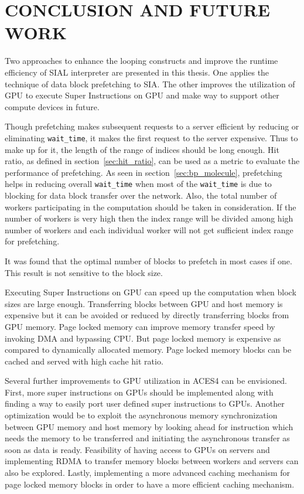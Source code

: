 \chapter{CONCLUSION AND FUTURE WORK}\label{conclusion}
Two approaches to enhance the looping constructs and improve the runtime efficiency
of SIAL interpreter are presented in this thesis. One applies the technique of
data block prefetching to SIA. The other improves
the utilization of GPU to execute Super Instructions on GPU and make way to support
other compute devices in future.

Though prefetching makes subsequent requests to a server efficient by reducing or
eliminating \texttt{wait\_time}, it makes the first request to the server expensive.
Thus to make up for it, the length of the range of indices should be long enough. Hit
ratio, as defined in section~\ref{sec:hit_ratio}, can be used as a metric to evaluate
the performance of prefetching. As seen in section~\ref{sec:bp_molecule}, prefetching
helps in reducing overall \texttt{wait\_time} when most of the \texttt{wait\_time}
is due to blocking for data block transfer over the network. Also, the total number
of workers participating in the computation should be taken in consideration.
If the number of workers is very high then the index range will be divided among high number
of workers and each individual worker will not get sufficient index range for prefetching.

It was found that the optimal number of blocks to prefetch in most cases if one.
This result is not sensitive to the block size.

Executing Super Instructions on GPU can speed up the computation when block sizes
are large enough. Transferring blocks between GPU and host memory is expensive but it can be
avoided or reduced by directly transferring blocks from GPU memory.
Page locked memory
can improve memory transfer speed by invoking DMA and bypassing CPU. But page locked
memory is expensive as compared to dynamically allocated memory. Page locked
memory blocks can be cached and served with high cache hit ratio.

Several further improvements to GPU utilization in ACES4 can be envisioned. First,
more super instructions on GPUs should be implemented along with finding a way to
easily port user defined super instructions to GPUs. Another optimization would be
to exploit the asynchronous memory synchronization between GPU memory
and host memory by looking ahead for instruction which needs the memory
to be transferred and initiating the asynchronous transfer as soon as data is ready.
Feasibility of having access to GPUs on servers and implementing
RDMA to transfer memory blocks between workers and servers can also be explored. Lastly, implementing
a more advanced caching mechanism for page locked memory blocks in order to have a
more efficient caching mechanism.
